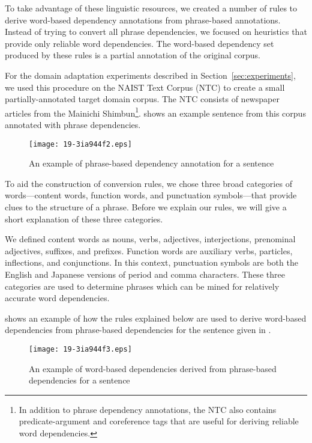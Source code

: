 \documentclass[english]{jnlp_1.4}
\def\figref#1{}
\begin{document}
To take advantage of these linguistic resources, we created a number of rules to derive word-based
dependency annotations from phrase-based annotations. Instead of trying to convert all phrase
dependencies, we focused on heuristics that provide only reliable word dependencies. The
word-based dependency set produced by these rules is a partial annotation of the original corpus.

For the domain adaptation experiments described in Section~\ref{sec:experiments}, we used this
procedure on the NAIST Text Corpus (NTC) \cite{iida2007} to create a small
partially-annotated target domain corpus. The NTC consists of newspaper articles from the Mainichi
Shimbun\footnote{In addition to phrase dependency annotations, the NTC also contains
  predicate-argument and coreference tags that are useful for deriving
  reliable word dependencies.}. \figref{figure:phrase} shows an example sentence from this corpus annotated with phrase
dependencies.

\begin{figure}[b]
\begin{center}
\texttt{[image: 19-3ia944f2.eps]}
\end{center}
\caption{An example of phrase-based dependency annotation for a sentence}
\label{figure:phrase}
\end{figure}

To aid the construction of conversion rules, we chose three broad categories of words---content
words, function words, and punctuation symbols---that provide clues to the structure of a
phrase. Before we explain our rules, we will give a short explanation of these three categories.

We defined content words as nouns, verbs, adjectives, interjections, prenominal adjectives,
suffixes, and prefixes. Function words are auxiliary verbs, particles, inflections, and
conjunctions. In this context, punctuation symbols are both the English and Japanese versions of
period and comma characters. These three categories are used to determine phrases which can be mined
for relatively accurate word dependencies.

\figref{figure:conv} shows an example of how the rules explained below are used to derive word-based
dependencies from phrase-based dependencies for the sentence given in \figref{figure:phrase}.

\begin{figure}[t]
\begin{center}
\texttt{[image: 19-3ia944f3.eps]}
\end{center}
\caption{An example of word-based dependencies derived from
  phrase-based dependencies for a sentence}
  \label{figure:conv}
\vspace{-0.5\Cvs}
\end{figure}
\end{document}
